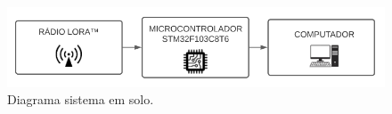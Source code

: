 



\begin{figure}[ht]
    \centering
    \caption{Diagrama sistema em solo.}
    \begin{center}
        \includegraphics[width=1.0\textwidth]{img/Fluxograma_Sistema2.png}
    \end{center}
    \vspace{-0.5cm}
    \label{fig:Fluxograma_Sistema2}
\end{figure}
